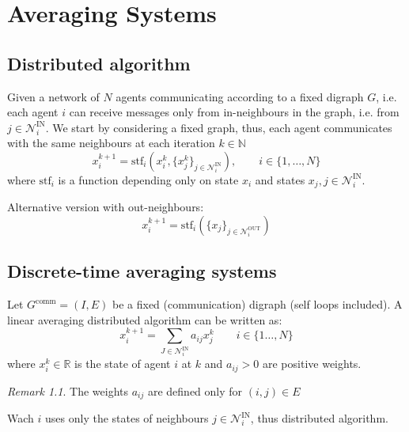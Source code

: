 \documentclass{book}
\newcommand{\R}{\mathbb{R}}
\newcommand{\N}{\mathbb{N}}
\theoremstyle{theoremv2}
\theoremstyle{defv2}
\theoremstyle{remark}
\newtheorem*{remark}{Remark}
\theoremstyle{remark}
\theoremstyle{definition}
\theoremstyle{definition}
\begin{document}
\chapter{Averaging Systems}
\section{Distributed algorithm}
Given a network of $N$ agents communicating according to a fixed digraph $G$, i.e. each agent $i$ can receive messages only from in-neighbours in the graph, i.e. from $j\in\mathcal{N}_i^{\text{IN}}$. 
We start by considering a fixed graph, thus, each agent communicates with the same neighbours at each iteration $k\in\N$
\[
    x_i^{k+1}=\text{stf}_i(x_i^k,\{x_j^k\}_{j\in\mathcal{N}_i^{\text{IN}}}), \qquad i\in\{1,\dots,N\}
\]
where $\text{stf}_i$ is a function depending only on state $x_i$ and states $x_j,j\in\mathcal{N}_i^{\text{IN}}$.

Alternative version with out-neighbours:
\[
    x_i^{k+1}=\text{stf}_i(\{x_j\}_{j\in\mathcal{N}_i^{\text{OUT}}})
\]
\section{Discrete-time averaging systems}
Let $G^{\text{comm}}=(I,E)$ be a fixed (communication) digraph (self loops included). A linear averaging distributed algorithm can be written as:
\[
    x_i^{k+1}=\displaystyle\sum_{J\in\mathcal{N}_i^{\text{IN}}}a_{ij}x_j^k \qquad i\in\{1\dots,N\}
\]
where $x_i^k\in\R$ is the state of agent $i$ at $k$ and $a_{ij}>0$ are positive weights. 
\begin{remark}
    The weights $a_{ij}$ are defined only for $(i,j)\in E$
\end{remark}
Wach $i$ uses only the states of neighbours $j\in\mathcal{N}_i^{\text{IN}}$, thus distributed algorithm.
\end{document}
